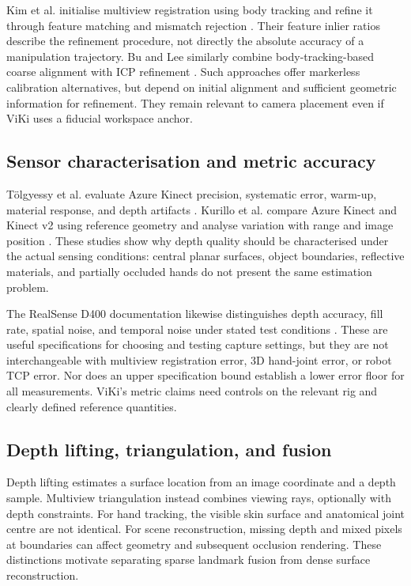 Kim et al. initialise multiview registration using body tracking and refine it
through feature matching and mismatch rejection \cite{kimcal}. Their feature
inlier ratios describe the refinement procedure, not directly the absolute
accuracy of a manipulation trajectory. Bu and Lee similarly combine
body-tracking-based coarse alignment with ICP refinement \cite{bulee}.
Such approaches offer markerless calibration alternatives, but depend on
initial alignment and sufficient geometric information for refinement. They
remain relevant to camera placement even if ViKi uses a fiducial workspace
anchor.

\subsection{Sensor characterisation and metric accuracy}

T\"olgyessy et al. evaluate Azure Kinect precision, systematic error, warm-up,
material response, and depth artifacts \cite{tolgyessy}. Kurillo et al.
compare Azure Kinect and Kinect v2 using reference geometry and analyse
variation with range and image position \cite{kurillo}. These studies show
why depth quality should be characterised under the actual sensing conditions:
central planar surfaces, object boundaries, reflective materials, and partially
occluded hands do not present the same estimation problem.

The RealSense D400 documentation likewise distinguishes depth accuracy, fill
rate, spatial noise, and temporal noise under stated test conditions
\cite{intel}. These are useful specifications for choosing and testing capture
settings, but they are not interchangeable with multiview registration error,
3D hand-joint error, or robot TCP error. Nor does an upper specification bound
establish a lower error floor for all measurements. ViKi's metric claims need
controls on the relevant rig and clearly defined reference quantities.

\subsection{Depth lifting, triangulation, and fusion}

Depth lifting estimates a surface location from an image coordinate and a depth
sample. Multiview triangulation instead combines viewing rays, optionally with
depth constraints. For hand tracking, the visible skin surface and anatomical
joint centre are not identical. For scene reconstruction, missing depth and
mixed pixels at boundaries can affect geometry and subsequent occlusion
rendering. These distinctions motivate separating sparse landmark fusion from
dense surface reconstruction.

